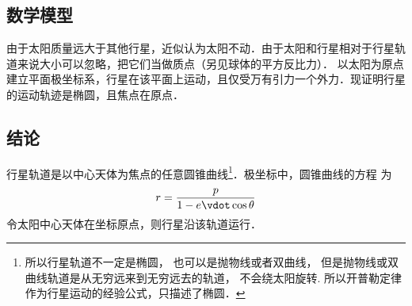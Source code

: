 

\subsection{数学模型}
由于太阳质量远大于其他行星，近似认为太阳不动．由于太阳和行星相对于行星轨道来说大小可以忽略，把它们当做质点（另见球体的平方反比力）．%
以太阳为原点建立平面极坐标系，行星在该平面上运动，且仅受万有引力一个外力．现证明行星的运动轨迹是椭圆，且焦点在原点．

\subsection{结论}
行星轨道是以中心天体为焦点的任意圆锥曲线\footnote{所以行星轨道不一定是椭圆， 也可以是抛物线或者双曲线， 但是抛物线或双曲线轨道是从无穷远来到无穷远去的轨道， 不会绕太阳旋转. 所以开普勒定律作为行星运动的经验公式，只描述了椭圆．}．极坐标中，圆锥曲线的方程
为
\begin{equation}\label{Keple1_eq1}
r = \frac{p}{1 - e \vdot \cos \theta }
\end{equation}
令太阳中心天体在坐标原点，则行星沿该轨道运行．

